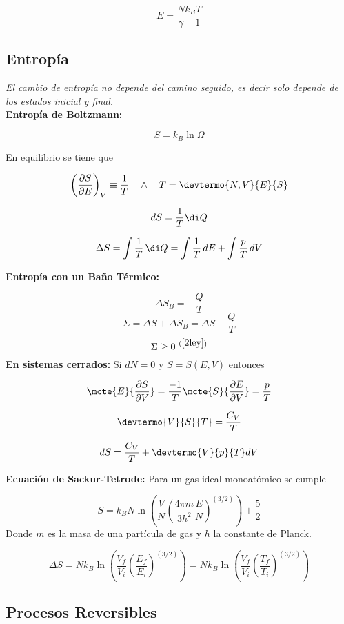 \[E=\frac{Nk_BT}{\gamma-1}\]


\subsection{Entropía}
\textit{El cambio de entropía no depende del camino seguido, es decir solo depende de los estados inicial y final.}\\

\textbf{Entropía de Boltzmann:}

\[S = k_B\ln{\Omega}\]
\bigbreak

 En equilibrio se tiene que

\[\left( \frac{\partial S}{\partial E} \right)_{V} \equiv \frac{1}{T} \quad \land \quad T = \devtermo{N,V}{E}{S}\]

\[dS = \frac{1}{T} \di Q\]

\[\Delta S = \int \frac{1}{T}\,\di Q = \int\frac{1}{T}\,dE+
\int\frac{p}{T}\,dV\]

\bigbreak

\textbf{Entropía con un Baño Térmico:}

\[\Delta S_B=-\frac{Q}{T}\]
\[\Sigma = \Delta S+\Delta S_B=\Delta S-\frac{Q}{T}\]
\[\Sigma \geq 0 \text{ }^{(\ref{2ley})}\]
\bigbreak
\textbf{En sistemas cerrados:} Si $dN = 0$ y $S = S(E, V)$ entonces

\[\mcte{E}{\frac{\partial S}{\partial V}} = 
\frac{-1}{T}\mcte{S}{\frac{\partial E}{\partial V}}=\frac{p}{T}\]

\[\devtermo{V}{S}{T}=\frac{C_V}{T}\]

\[dS = \frac{C_V}{T}+\devtermo{V}{p}{T}dV\]

\bigbreak

\textbf{Ecuación de Sackur-Tetrode:} Para un gas ideal monoatómico se cumple 

\[S=k_BN\ln{\left(\frac{V}{N}\left(\frac{4\pi m}{3h^2}
\frac{E}{N}\right)^{(3/2)}\right)}+\frac{5}{2}\]
\bigbreak
Donde $m$ es la masa de una partícula de gas y $h$ la constante de Planck.

\[\Delta S = Nk_B\ln{\left(\frac{V_f}{V_i}\left(
\frac{E_f}{E_i}\right)^{(3/2)}\right)}=Nk_B\ln{\left( \frac{V_f}{V_i}\left(\frac{T_f}{T_i}\right)^{(3/2)}\right)}\]

\subsection{Procesos Reversibles}

